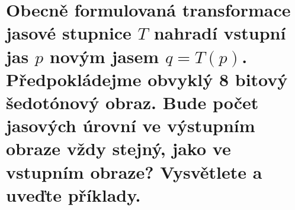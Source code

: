 \section{Obecně formulovaná transformace jasové stupnice $T$ nahradí vstupní jas $p$ novým jasem $q=T(p)$. 
Předpokládejme obvyklý 8 bitový šedotónový obraz. Bude počet jasových úrovní ve výstupním obraze vždy stejný, jako ve 
vstupním obraze? Vysvětlete a uveďte příklady.}
